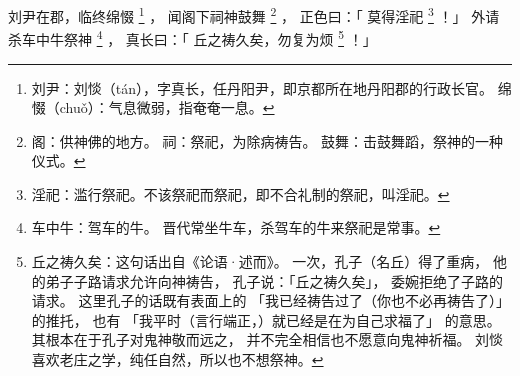 
\switchcolumn*[\section{}]

刘尹在郡，临终绵惙%
\footnote{%
    刘尹：刘惔（tán），字真长，任丹阳尹，即京都所在地丹阳郡的行政长官。
    绵惙（chuǒ）：气息微弱，指奄奄一息。
}%
，
闻阁下祠神鼓舞%
\footnote{%
    阁：供神佛的地方。
    祠：祭祀，为除病祷告。
    鼓舞：击鼓舞蹈，祭神的一种仪式。
}%
，
正色曰：「
    莫得淫祀%
    \footnote{%
        淫祀：滥行祭祀。不该祭祀而祭祀，即不合礼制的祭祀，叫淫祀。
    }%
！」
外请杀车中牛祭神%
\footnote{%
    车中牛：驾车的牛。
            晋代常坐牛车，杀驾车的牛来祭祀是常事。
}%
，
真长曰：「
    丘之祷久矣，勿复为烦%
    \footnote{%
        丘之祷久矣：这句话出自《论语·述而》。
                    一次，孔子（名丘）得了重病，
                    他的弟子子路请求允许向神祷告，
                    孔子说：「丘之祷久矣」，
                    委婉拒绝了子路的请求。
                    这里孔子的话既有表面上的
                    「我已经祷告过了（你也不必再祷告了）」
                    的推托，
                    也有
                    「我平时（言行端正，）就已经是在为自己求福了」
                    的意思。
                    其根本在于孔子对鬼神敬而远之，
                    并不完全相信也不愿意向鬼神祈福。
                    刘惔喜欢老庄之学，纯任自然，所以也不想祭神。
    }%
！」

\switchcolumn



